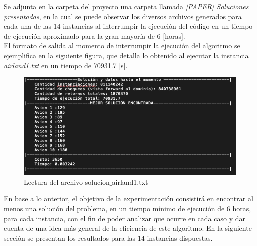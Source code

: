 \documentclass[letter, 10pt]{article}
\begin{document}
Se adjunta en la carpeta del proyecto una carpeta llamada \textit{[PAPER] Soluciones presentadas}, en la cual se puede observar los diversos archivos generados para cada una de las 14 instancias al interrumpir la ejecución del código en un tiempo de ejecución aproximado para la gran mayoría de 6 [horas].\\

El formato de salida al momento de interrumpir la ejecución del algoritmo se ejemplifica en la siguiente figura, que detalla lo obtenido al ejecutar la instancia \textit{airland1.txt} en un tiempo de 70931.7 [s].\\

\begin{figure}[h]
    \centering
    \includegraphics[width=14cm]{airland1.png}
    \caption{Lectura del archivo solucion$\_$airland1.txt}
    \label{fig:my_label}
\end{figure}

En base a lo anterior, el objetivo de la experimentación consistirá en encontrar al menos una solución del problema, en un tiempo mínimo de ejecución de 6 horas, para cada instancia, con el fin de poder analizar que ocurre en cada caso y dar cuenta de una idea más general de la eficiencia de este algoritmo. En la siguiente sección se presentan los resultados para las 14 instancias dispuestas.\\

\newpage
\end{document}
